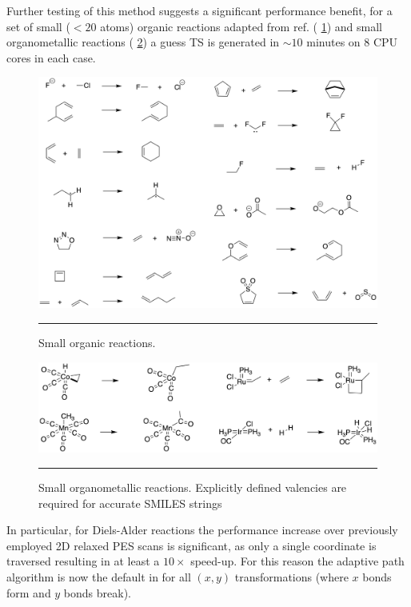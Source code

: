 \documentclass[../../main.tex]{subfiles}
\begin{document}
Further testing of this method suggests a significant performance benefit, for a set of small ($< 20$ atoms) organic reactions adapted from ref. \cite{Vaucher2018} (\figurename{ \ref{fig::ade_further_4}}) and small organometallic reactions\cite{autodE} (\figurename{ \ref{fig::ade_further_5}}) a guess TS is generated in $\sim 10$ minutes on 8 CPU cores in each case.

\begin{figure}[h!]
	\vspace{0.4cm}
	\centering
	\includegraphics[width=15cm]{5/further/figs/fig4/fig4.png}
	\vspace{0.4cm}
	\hrule
	\caption{Small organic reactions.}
	\label{fig::ade_further_4}
\end{figure}

\begin{figure}[h!]
	\vspace{0.4cm}
	\centering
	\includegraphics[width=15cm]{5/further/figs/fig5/fig5.png}
	\vspace{0.4cm}
	\hrule
	\caption{Small organometallic reactions. Explicitly defined valencies are required for accurate SMILES strings}
	\label{fig::ade_further_5} 
\end{figure}

In particular, for Diels-Alder reactions the performance increase over previously employed 2D relaxed PES scans is significant, as only a single coordinate is traversed resulting in at least a $10 \times$ speed-up. For this reason the adaptive path algorithm is now the default in \ade for all $(x, y)$ transformations (where $x$ bonds form and $y$ bonds break).
\end{document}
